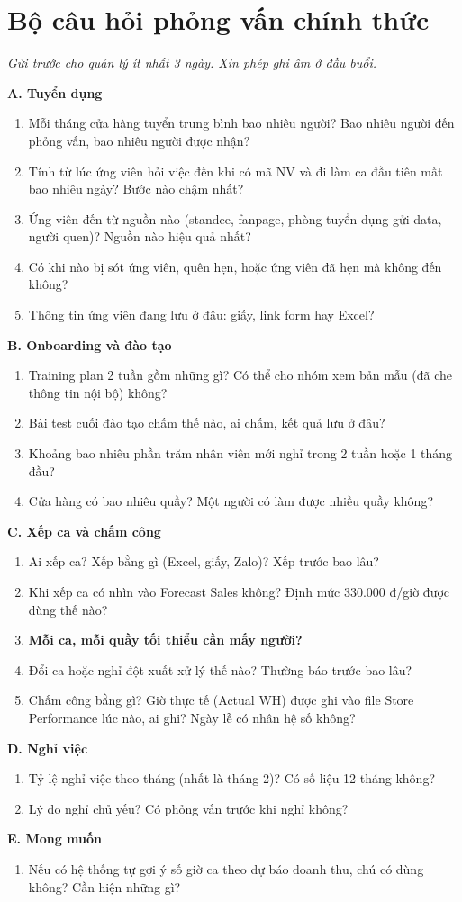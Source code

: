 \documentclass[12pt,a4paper,oneside]{report}
\begin{document}
\chapter{Bộ câu hỏi phỏng vấn chính thức}
\emph{Gửi trước cho quản lý ít nhất 3 ngày. Xin phép ghi âm ở đầu buổi.}

\textbf{A. Tuyển dụng}
\begin{enumerate}
\item Mỗi tháng cửa hàng tuyển trung bình bao nhiêu người? Bao nhiêu người đến phỏng vấn, bao nhiêu người được nhận?
\item Tính từ lúc ứng viên hỏi việc đến khi có mã NV và đi làm ca đầu tiên mất bao nhiêu ngày? Bước nào chậm nhất?
\item Ứng viên đến từ nguồn nào (standee, fanpage, phòng tuyển dụng gửi data, người quen)? Nguồn nào hiệu quả nhất?
\item Có khi nào bị sót ứng viên, quên hẹn, hoặc ứng viên đã hẹn mà không đến không?
\item Thông tin ứng viên đang lưu ở đâu: giấy, link form hay Excel?
\end{enumerate}
\textbf{B. Onboarding và đào tạo}
\begin{enumerate}[resume]
\item Training plan 2 tuần gồm những gì? Có thể cho nhóm xem bản mẫu (đã che thông tin nội bộ) không?
\item Bài test cuối đào tạo chấm thế nào, ai chấm, kết quả lưu ở đâu?
\item Khoảng bao nhiêu phần trăm nhân viên mới nghỉ trong 2 tuần hoặc 1 tháng đầu?
\item Cửa hàng có bao nhiêu quầy? Một người có làm được nhiều quầy không?
\end{enumerate}
\textbf{C. Xếp ca và chấm công}
\begin{enumerate}[resume]
\item Ai xếp ca? Xếp bằng gì (Excel, giấy, Zalo)? Xếp trước bao lâu?
\item Khi xếp ca có nhìn vào Forecast Sales không? Định mức 330.000 đ/giờ được dùng thế nào?
\item \textbf{Mỗi ca, mỗi quầy tối thiểu cần mấy người?}
\item Đổi ca hoặc nghỉ đột xuất xử lý thế nào? Thường báo trước bao lâu?
\item Chấm công bằng gì? Giờ thực tế (Actual WH) được ghi vào file Store Performance lúc nào, ai ghi? Ngày lễ có nhân hệ số không?
\end{enumerate}
\textbf{D. Nghỉ việc}
\begin{enumerate}[resume]
\item Tỷ lệ nghỉ việc theo tháng (nhất là tháng 2)? Có số liệu 12 tháng không?
\item Lý do nghỉ chủ yếu? Có phỏng vấn trước khi nghỉ không?
\end{enumerate}
\textbf{E. Mong muốn}
\begin{enumerate}[resume]
\item Nếu có hệ thống tự gợi ý số giờ ca theo dự báo doanh thu, chú có dùng không? Cần hiện những gì?
\end{enumerate}
\end{document}
